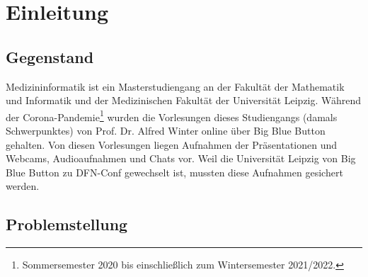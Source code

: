 \chapter{Einleitung}\label{ch:introduction}

\section{Gegenstand}

Medizininformatik ist ein Masterstudiengang an der Fakultät der Mathematik und Informatik und der Medizinischen Fakultät der Universität Leipzig.
Während der Corona-Pandemie\footnote{Sommersemester 2020 bis einschließlich zum Wintersemester 2021/2022.} wurden die Vorlesungen dieses Studiengangs (damals Schwerpunktes) von Prof. Dr. Alfred Winter online über Big Blue Button gehalten.
Von diesen Vorlesungen liegen Aufnahmen der Präsentationen und Webcams, Audioaufnahmen und Chats vor. Weil die Universität Leipzig von Big Blue Button zu DFN-Conf gewechselt ist, mussten diese Aufnahmen gesichert werden.





\section{Problemstellung}



